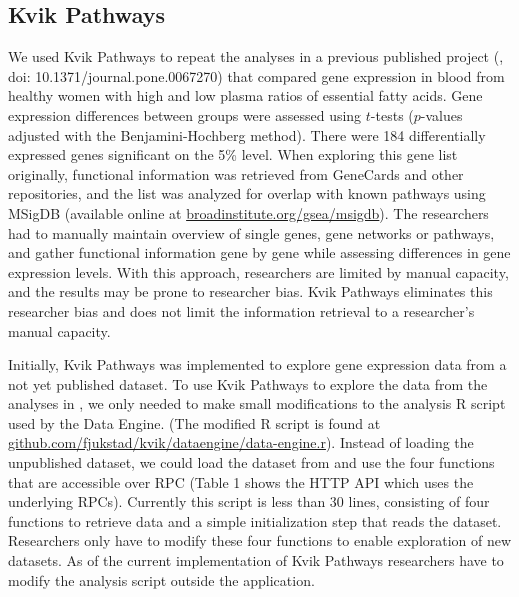 \subsection{Kvik Pathways} 
We used Kvik Pathways to repeat the analyses in a previous published project
(\cite{olsen2013plasma}, doi: 10.1371/journal.pone.0067270) that compared 
gene expression in blood from healthy
women with high and low plasma ratios of essential fatty acids. Gene
expression differences between groups were assessed using $t$-tests
($p$-values adjusted with the Benjamini-Hochberg method). There were 184
differentially expressed genes significant on the 5\% level. When exploring
this gene list originally, functional information was retrieved from
GeneCards and other repositories, and the list was analyzed for overlap with
known pathways using MSigDB (available online at \href{broadinstitute.org/gsea/msigdb}{broadinstitute.org/gsea/msigdb}). The
researchers had to manually maintain overview of single genes, gene networks
or pathways, and gather functional information gene by gene while assessing
differences in gene expression levels.  With this approach, researchers are
limited by manual capacity, and the results may be prone to researcher bias.
Kvik Pathways eliminates this researcher bias and does not limit the information
retrieval to a researcher's manual capacity. 

Initially, Kvik Pathways was implemented to explore gene expression data
from a not yet published dataset.  To use Kvik Pathways to explore the data
from the analyses in \cite{olsen2013plasma}, we only needed to make small
modifications to the analysis R script used by the Data Engine. (The modified R
script is found at
\href{github.com/fjukstad/kvik/dataengine/data-engine.r}{github.com/fjukstad/kvik/dataengine/data-engine.r}).
Instead of loading the unpublished dataset, we could load the dataset from
\cite{olsen2013plasma} and use the four functions that are accessible over RPC (Table 1
shows the HTTP API which uses the underlying RPCs).
Currently this script is less than 30 lines, consisting of four functions to
retrieve data and a simple initialization step that reads the dataset. 
Researchers only
have to modify these four functions to enable exploration of new datasets. As of 
the current implementation of Kvik Pathways researchers have to modify the analysis script 	
outside the application.

